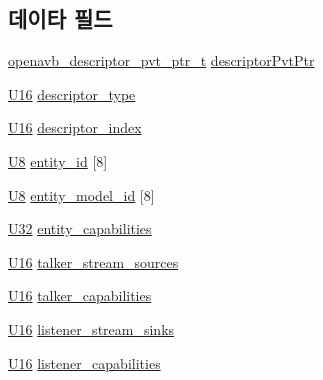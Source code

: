 \subsection*{데이타 필드}
\begin{DoxyCompactItemize}
\item 
\hyperlink{openavb__aem__pub_8h_a85eabab4b7d2466e94c1c3b43b11371d}{openavb\+\_\+descriptor\+\_\+pvt\+\_\+ptr\+\_\+t} \hyperlink{structopenavb__aem__descriptor__entity__t_a302e92fd6cf4d398d5305395359fb157}{descriptor\+Pvt\+Ptr}
\item 
\hyperlink{openavb__types__base__pub_8h_a0a0a322d5fa4a546d293a77ba8b4a71f}{U16} \hyperlink{structopenavb__aem__descriptor__entity__t_a1e231d7874aada5925b29affc76782cc}{descriptor\+\_\+type}
\item 
\hyperlink{openavb__types__base__pub_8h_a0a0a322d5fa4a546d293a77ba8b4a71f}{U16} \hyperlink{structopenavb__aem__descriptor__entity__t_ab26fb363c24b9a2a4391f9171c981b08}{descriptor\+\_\+index}
\item 
\hyperlink{openavb__types__base__pub_8h_aa63ef7b996d5487ce35a5a66601f3e73}{U8} \hyperlink{structopenavb__aem__descriptor__entity__t_ab748fb58fac21e84c356282323c9b9e2}{entity\+\_\+id} \mbox{[}8\mbox{]}
\item 
\hyperlink{openavb__types__base__pub_8h_aa63ef7b996d5487ce35a5a66601f3e73}{U8} \hyperlink{structopenavb__aem__descriptor__entity__t_a10141ef89fe144c95be49eeb9a34b2d1}{entity\+\_\+model\+\_\+id} \mbox{[}8\mbox{]}
\item 
\hyperlink{openavb__types__base__pub_8h_a696390429f2f3b644bde8d0322a24124}{U32} \hyperlink{structopenavb__aem__descriptor__entity__t_ac778b7422da24a5903fadab48c5d4850}{entity\+\_\+capabilities}
\item 
\hyperlink{openavb__types__base__pub_8h_a0a0a322d5fa4a546d293a77ba8b4a71f}{U16} \hyperlink{structopenavb__aem__descriptor__entity__t_a1cef978c7d5f0fe43e419f34dea172ab}{talker\+\_\+stream\+\_\+sources}
\item 
\hyperlink{openavb__types__base__pub_8h_a0a0a322d5fa4a546d293a77ba8b4a71f}{U16} \hyperlink{structopenavb__aem__descriptor__entity__t_a3a68601d6925b6f1c051f043ce6960ea}{talker\+\_\+capabilities}
\item 
\hyperlink{openavb__types__base__pub_8h_a0a0a322d5fa4a546d293a77ba8b4a71f}{U16} \hyperlink{structopenavb__aem__descriptor__entity__t_afcd73932b3d14b611b7af06f5e11c79b}{listener\+\_\+stream\+\_\+sinks}
\item 
\hyperlink{openavb__types__base__pub_8h_a0a0a322d5fa4a546d293a77ba8b4a71f}{U16} \hyperlink{structopenavb__aem__descriptor__entity__t_a53c2042d30d525b821c23ec62838a448}{listener\+\_\+capabilities}

\end{DoxyCompactItemize}
